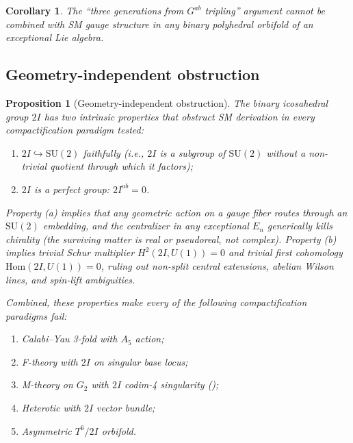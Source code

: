 \documentclass[11pt,a4paper]{amsart}
\newtheorem{proposition}[theorem]{Proposition}
\newtheorem{corollary}[theorem]{Corollary}
\theoremstyle{definition}
\theoremstyle{remark}
\newcommand{\SU}{\mathrm{SU}}
\newcommand{\Hom}{\mathrm{Hom}}
\begin{document}
\begin{corollary}
The ``three generations from $G^{ab}$ tripling'' argument cannot be combined
with SM gauge structure in any binary polyhedral orbifold of an exceptional
Lie algebra.
\end{corollary}

\subsection{Geometry-independent obstruction}

\begin{proposition}[Geometry-independent obstruction]\label{thm:geom-indep}
The binary icosahedral group $2I$ has two intrinsic properties that obstruct
SM derivation in every compactification paradigm tested:

\begin{enumerate}[label=(\alph*)]
  \item $2I \hookrightarrow \SU(2)$ faithfully (i.e., $2I$ is a subgroup of
        $\SU(2)$ without a non-trivial quotient through which it factors);
  \item $2I$ is a perfect group: $2I^{ab} = 0$.
\end{enumerate}

Property (a) implies that any geometric action on a gauge fiber routes through
an $\SU(2)$ embedding, and the centralizer in any exceptional $E_n$ generically
kills chirality (the surviving matter is real or pseudoreal, not complex).
Property (b) implies trivial Schur multiplier $H^2(2I, U(1)) = 0$ and trivial
first cohomology $\Hom(2I, U(1)) = 0$, ruling out non-split central
extensions, abelian Wilson lines, and spin-lift ambiguities.

Combined, these properties make every of the following compactification
paradigms fail:

\begin{enumerate}
  \item Calabi--Yau 3-fold with $A_5$ action;
  \item F-theory with $2I$ on singular base locus;
  \item M-theory on $G_2$ with $2I$ codim-4 singularity (\cite{AcharyaWitten2001});
  \item Heterotic with $2I$ vector bundle;
  \item Asymmetric $T^6/2I$ orbifold.
\end{enumerate}
\end{proposition}
\end{document}
